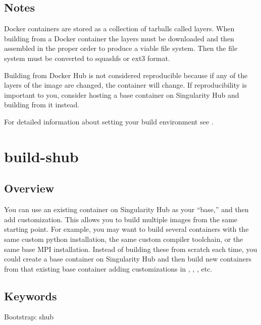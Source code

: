 \documentclass[letterpaper,10pt,english]{sphinxmanual}
\begin{document}
\subsection{Notes}
\label{\detokenize{appendix:notes}}
Docker containers are stored as a collection of tarballs called layers. When building from a Docker container the layers must be downloaded and then
assembled in the proper order to produce a viable file system. Then the file system must be converted to squashfs or ext3 format.

Building from Docker Hub is not considered reproducible because if any of the layers of the image are changed, the container will change.
If reproducibility is important to you, consider hosting a base container on Singularity Hub and building from it instead.

For detailed information about setting your build environment see {\hyperref[\detokenize{build_environment:build-environment}]{}}.


\section{build-shub}
\label{\detokenize{appendix:build-shub}}\label{\detokenize{appendix:id2}}

\subsection{Overview}
\label{\detokenize{appendix:sec-build-shub}}\label{\detokenize{appendix:id3}}
You can use an existing container on Singularity Hub as your “base,” and then add customization. This allows you to build multiple images
from the same starting point. For example, you may want to build several containers with the same custom python installation, the same custom
compiler toolchain, or the same base MPI installation. Instead of building these from scratch each time, you could create a base container on
Singularity Hub and then build new containers from that existing base container adding customizations in  , , , etc.


\subsection{Keywords}
\label{\detokenize{appendix:id4}}
%
\begin{sphinxVerbatim}[commandchars=\\\{\}]
Bootstrap: shub
\end{sphinxVerbatim}
\end{document}
